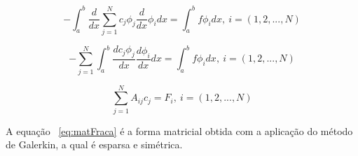   \begin{equation}
  - \int_{a}^{b} 
 	\frac{d}{dx} 
 	\sum_{j = 1}^{N} c_j \phi_j
 	\frac{d}{dx} \phi_i dx = \int_{a}^{b} f\phi_i dx, \ i = (1, 2, ..., N)
  \end{equation} 
  
    \begin{equation}
    -\sum_{j = 1}^{N} \int_{a}^{b} 
   	\frac{d c_j \phi_j}{dx}    	 
   	\frac{d \phi_i}{dx}  dx = \int_{a}^{b} f\phi_i dx, \ i = (1, 2, ..., N)
    \end{equation} 
    
    \begin{equation}
    \label{eq:matFraca}
    \sum_{j = 1}^{N} 
    	A_{ij} c_j = F_i,  \ i = (1, 2, ..., N)
    \end{equation} 
    
A equação  ~\ref{eq:matFraca} é a forma matricial obtida com a aplicação do método de Galerkin, a qual é esparsa e simétrica.
